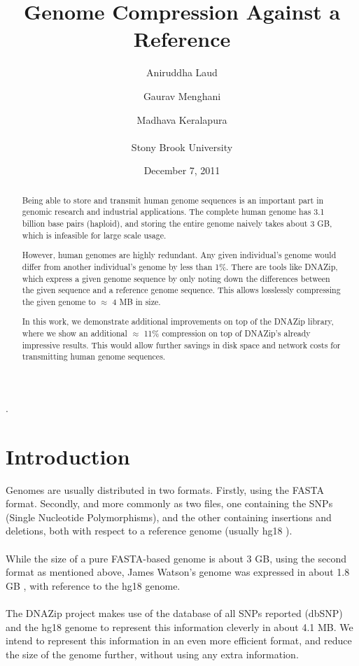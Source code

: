 \documentclass{article}
\title{Genome Compression Against a Reference}
\author{Aniruddha Laud
\and
Gaurav Menghani
\and
Madhava Keralapura\\ \\
Stony Brook University
}
\date{December 7, 2011}
\begin{document}
\maketitle
.

\vspace*{0.25cm}
\begin{abstract}
Being able to store and transmit human genome sequences is an important part in
genomic research and industrial applications. The complete human genome has 3.1
billion base pairs (haploid), and storing the entire genome naively takes about
3 GB, which is infeasible for large scale usage.

However, human genomes are highly redundant. Any given individual's genome would
differ from another individual's genome by less than 1\%. There are tools like
DNAZip, which express a given genome sequence by only noting down the
differences between the given sequence and a reference genome sequence. This
allows losslessly compressing the given genome to $\approx$ 4 MB in size.
 
In this work, we demonstrate additional improvements on top of the DNAZip
library, where we show an additional $\approx$ 11\% compression on top of
DNAZip's already impressive results. This would allow further savings in disk
space and network costs for transmitting human genome sequences.
\end{abstract}
\vspace*{0.25cm}

\clearpage

\tableofcontents

\clearpage

\section {Introduction}
Genomes are usually distributed in two formats. Firstly, using the FASTA format.
Secondly, and more commonly as two files, one containing the SNPs (Single
Nucleotide Polymorphisms), and the other containing insertions and deletions,
both with respect to a reference genome (usually hg18 
\cite{ucschg, ucschg18}).\\ 
\\
While the size of a pure FASTA-based genome is about 3 GB, using the second
format as mentioned above, James Watson's genome was expressed in about 1.8 GB
\cite{jwseq}, with reference to the hg18 genome. \\
\\
The DNAZip project \cite{dnazip} makes use of the database of all SNPs reported
(dbSNP) and the hg18 genome to represent this information cleverly in about 4.1
MB. We intend to represent this information in an even more efficient format,
and reduce the size of the genome further, without using any extra information.
\clearpage
\end{document}
